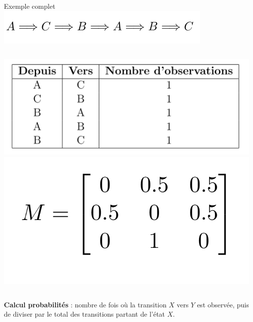 \begin{frame}{Exemple complet}
	\vspace{-0.5cm}
	\centering
	\includegraphics[width=0.8\textwidth]{images/transition_ex_markov.png}
	\vspace{1cm}
	\begin{columns}
		\includegraphics[width=\textwidth]{images/tableau_ex_markov.png}
		\includegraphics[width=\textwidth]{images/matrice_markov.png}
	\end{columns}
	\vspace{1cm}
	\textbf{Calcul probabilités} :  nombre de fois où la transition \(X\) vers \(Y\) est observée, puis de diviser par le total des transitions partant de l'état \(X\).
\end{frame}
